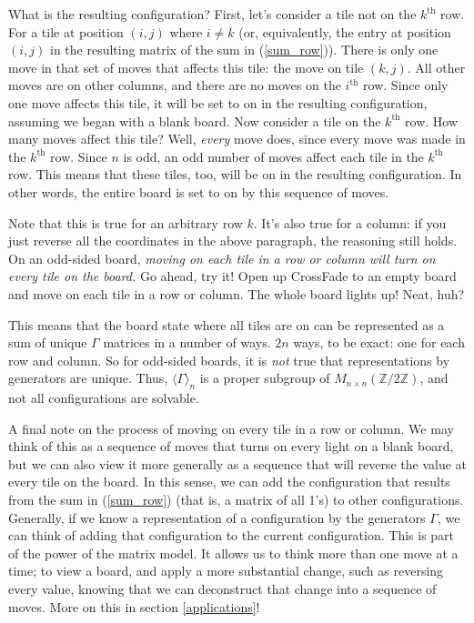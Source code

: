 \documentclass{article}[12pt]
\newcommand{\supt}[1]{^{\text{#1}}}
\newcommand{\group}[1]{M_{#1 \times #1}(\mathbb{Z}/2\mathbb{Z})}
\newcommand{\subgroup}[1]{\langle\Gamma\rangle_{#1}}
\newcommand{\refx}[1]{(\ref{#1})}
\begin{document}
What is the resulting configuration?  First, let's consider a tile not on the $k\supt{th}$ row.  For a tile at position $(i,j)$ where $i \neq k$ (or, equivalently, the entry at position $(i,j)$ in the resulting matrix of the sum in \refx{sum_row}).  There is only one move in that set of moves that affects this tile: the move on tile $(k,j)$.  All other moves are on other columns, and there are no moves on the $i\supt{th}$ row.  Since only one move affects this tile, it will be set to on in the resulting configuration, assuming we began with a blank board.  Now consider a tile on the $k\supt{th}$ row.  How many moves affect this tile?  Well, \emph{every} move does, since every move was made in the $k\supt{th}$ row.  Since $n$ is odd, an odd number of moves affect each tile in the $k\supt{th}$ row.  This means that these tiles, too, will be on in the resulting configuration.  In other words, the entire board is set to on by this sequence of moves.

Note that this is true for an arbitrary row $k$.  It's also true for a column: if you just reverse all the coordinates in the above paragraph, the reasoning still holds.  On an odd-sided board, \emph{moving on each tile in a row or column will turn on every tile on the board.}  Go ahead, try it!  Open up CrossFade to an empty board and move on each tile in a row or column.  The whole board lights up!  Neat, huh?

This means that the board state where all tiles are on can be represented as a sum of unique $\Gamma$ matrices in a number of ways.  $2n$ ways, to be exact: one for each row and column.  So for odd-sided boards, it is \emph{not} true that representations by generators are unique.  Thus, $\subgroup{n}$ is a proper subgroup of $\group{n}$, and not all configurations are solvable.

A final note on the process of moving on every tile in a row or column.  We may think of this as a sequence of moves that turns on every light on a blank board, but we can also view it more generally as a sequence that will reverse the value at every tile on the board.  In this sense, we can add the configuration that results from the sum in \refx{sum_row} (that is, a matrix of all 1's) to other configurations.  Generally, if we know a representation of a configuration by the generators $\Gamma$, we can think of adding that configuration to the current configuration.  This is part of the power of the matrix model.  It allows us to think more than one move at a time; to view a board, and apply a more substantial change, such as reversing every value, knowing that we can deconstruct that change into a sequence of moves.  More on this in section \ref{applications}!
\end{document}
